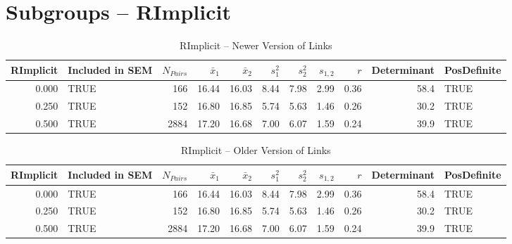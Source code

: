 \documentclass{article}\usepackage[]{graphicx}\usepackage[]{color}
\begin{document}
\section{Subgroups --  RImplicit }%
\begin{table}[ht]
\centering
\begin{tabular}{rlrrrrrrrrl}
  \hline
RImplicit & Included in SEM & $N_{Pairs}$ & $\bar{x}_1$ & $\bar{x}_2$ & $s_1^2$ & $s_2^2$ & $s_{1,2}$ & $r$ & Determinant & PosDefinite \\ 
  \hline
0.000 & TRUE & 166 & 16.44 & 16.03 & 8.44 & 7.98 & 2.99 & 0.36 & 58.4 & TRUE \\ 
  0.250 & TRUE & 152 & 16.80 & 16.85 & 5.74 & 5.63 & 1.46 & 0.26 & 30.2 & TRUE \\ 
  0.500 & TRUE & 2884 & 17.20 & 16.68 & 7.00 & 6.07 & 1.59 & 0.24 & 39.9 & TRUE \\ 
   \hline
\end{tabular}
\caption{RImplicit -- Newer Version of Links} 
\end{table}
\begin{table}[ht]
\centering
\begin{tabular}{rlrrrrrrrrl}
  \hline
RImplicit & Included in SEM & $N_{Pairs}$ & $\bar{x}_1$ & $\bar{x}_2$ & $s_1^2$ & $s_2^2$ & $s_{1,2}$ & $r$ & Determinant & PosDefinite \\ 
  \hline
0.000 & TRUE & 166 & 16.44 & 16.03 & 8.44 & 7.98 & 2.99 & 0.36 & 58.4 & TRUE \\ 
  0.250 & TRUE & 152 & 16.80 & 16.85 & 5.74 & 5.63 & 1.46 & 0.26 & 30.2 & TRUE \\ 
  0.500 & TRUE & 2884 & 17.20 & 16.68 & 7.00 & 6.07 & 1.59 & 0.24 & 39.9 & TRUE \\ 
   \hline
\end{tabular}
\caption{RImplicit -- Older Version of Links} 
\end{table}
\end{document}
